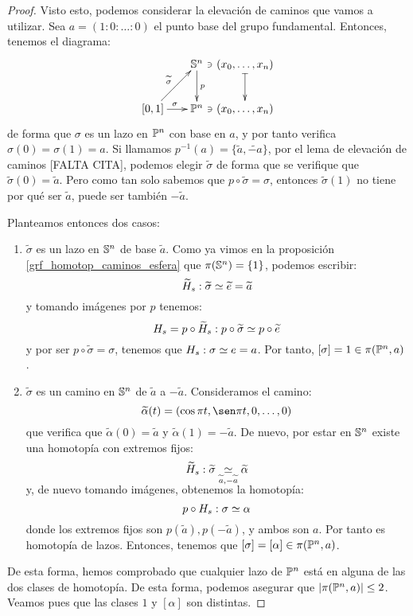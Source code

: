 \begin{theo}
\begin{proof}
		Visto esto, podemos considerar la elevación de caminos que vamos a utilizar. Sea $a=(1:0:\dotsc:0)$ el punto base del grupo fundamental. Entonces, tenemos el diagrama:
		\[\xymatrix @C = 0.5pc {
			&& \Sfe^n \ar[d]^p & (x_0,\dots,x_n) \ar@{|->}[d] \ar@{}[l]|-\ni \\
			[0,1] \ar[rr]^\sigma \ar[rru]^{\widetilde{\sigma}} && \proy^n & (x_0,\dotsc,x_n) \ar@{}[l]|-\ni
		}\]
		de forma que $\sigma$ es un lazo en $\proy^n$ con base en $a$, y por tanto verifica $\sigma(0)=\sigma(1)=a$. Si llamamos $p^{-1}(a)=\{\widetilde{a},\widetilde{-a}\}$, por el lema de elevación de caminos [FALTA CITA], podemos elegir $\widetilde{\sigma}$ de forma que se verifique que $\widetilde{\sigma}(0)=\widetilde{a}$. Pero como tan solo sabemos que $p\circ\widetilde{\sigma}=\sigma$, entonces $\widetilde{\sigma}(1)$ no tiene por qué ser $\widetilde{a}$, puede ser también $-\widetilde{a}$. %
		
		Planteamos entonces dos casos:
		\begin{enumerate}[label=\roman*]
			\item $\widetilde{\sigma}$ es un lazo en $\Sfe^n$ de base $\widetilde{a}$. Como ya vimos en la proposición \ref{grf_homotop_caminos_esfera} que $\pi(\Sfe^n)=\{1\}$, podemos escribir:
			\[\widetilde{H}_s:\widetilde{\sigma}\homot\widetilde{e}=\widetilde{a}\]
			y tomando imágenes por $p$ tenemos:
			\[H_s=p\circ\widetilde{H}_s:p\circ\widetilde{\sigma}\homot p\circ\widetilde{e}\]
			y por ser $p\circ\widetilde{\sigma}=\sigma$, tenemos que $H_s: \sigma\homot e=a$. Por tanto, $[\sigma] = 1\in\pi(\proy^n,a)$.
			
			\item $\widetilde{\sigma}$ es un camino en $\Sfe^n$ de $\widetilde{a}$ a $-\widetilde{a}$. Consideramos el camino:
			\[\widetilde{\alpha}(t)= (\cos\pi t, \sen\pi t,0,\dots, 0) \]
			que verifica que $\widetilde{\alpha}(0)=\widetilde{a}$ y $\widetilde{\alpha}(1)=-\widetilde{a}$. De nuevo, por estar en $\Sfe^n$ existe una homotopía con extremos fijos:
			\[\widetilde{H}_s:\widetilde{\sigma}\homot[\widetilde{a},-\widetilde{a}]\widetilde{\alpha}\]
			y, de nuevo tomando imágenes, obtenemos la homotopía:
			\[p\circ H_s:\sigma\homot\alpha\]
			donde los extremos fijos son $p(\widetilde{a}),p(-\widetilde{a})$, y ambos son $a$. Por tanto es homotopía de lazos. Entonces, tenemos que $[\sigma] = [\alpha]\in\pi(\proy^n,a)$.
		\end{enumerate}
		
		De esta forma, hemos comprobado que cualquier lazo de $\proy^n$ está en alguna de las dos clases de homotopía. De esta forma, podemos asegurar que $\card{\pi(\proy^n,a)}\leq 2$. Veamos pues que las clases $1$ y $[\alpha]$ son distintas.
		

\end{proof}
\end{theo}
